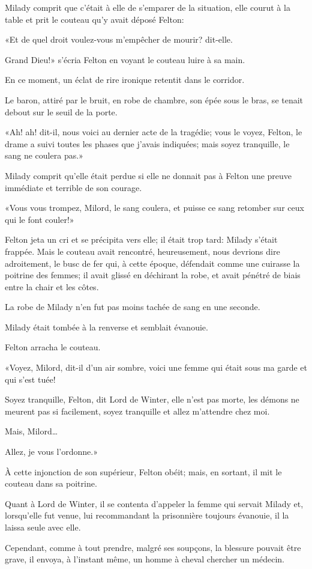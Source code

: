 Milady comprit que c'était à elle de s'emparer de la situation, elle courut à la table et prit le couteau qu'y avait déposé Felton: 

«Et de quel droit voulez-vous m'empêcher de mourir? dit-elle. 

\speak  Grand Dieu!» s'écria Felton en voyant le couteau luire à sa main. 

En ce moment, un éclat de rire ironique retentit dans le corridor. 

Le baron, attiré par le bruit, en robe de chambre, son épée sous le bras, se tenait debout sur le seuil de la porte. 

«Ah! ah! dit-il, nous voici au dernier acte de la tragédie; vous le voyez, Felton, le drame a suivi toutes les phases que j'avais indiquées; mais soyez tranquille, le sang ne coulera pas.» 

Milady comprit qu'elle était perdue si elle ne donnait pas à Felton une preuve immédiate et terrible de son courage. 

«Vous vous trompez, Milord, le sang coulera, et puisse ce sang retomber sur ceux qui le font couler!» 

Felton jeta un cri et se précipita vers elle; il était trop tard: Milady s'était frappée. Mais le couteau avait rencontré, heureusement, nous devrions dire adroitement, le busc de fer qui, à cette époque, défendait comme une cuirasse la poitrine des femmes; il avait glissé en déchirant la robe, et avait pénétré de biais entre la chair et les côtes. 

La robe de Milady n'en fut pas moins tachée de sang en une seconde. 

Milady était tombée à la renverse et semblait évanouie. 

Felton arracha le couteau. 

«Voyez, Milord, dit-il d'un air sombre, voici une femme qui était sous ma garde et qui s'est tuée! 

\speak  Soyez tranquille, Felton, dit Lord de Winter, elle n'est pas morte, les démons ne meurent pas si facilement, soyez tranquille et allez m'attendre chez moi. 

\speak  Mais, Milord\dots 

\speak  Allez, je vous l'ordonne.» 

À cette injonction de son supérieur, Felton obéit; mais, en sortant, il mit le couteau dans sa poitrine. 

Quant à Lord de Winter, il se contenta d'appeler la femme qui servait Milady et, lorsqu'elle fut venue, lui recommandant la prisonnière toujours évanouie, il la laissa seule avec elle. 

Cependant, comme à tout prendre, malgré ses soupçons, la blessure pouvait être grave, il envoya, à l'instant même, un homme à cheval chercher un médecin.